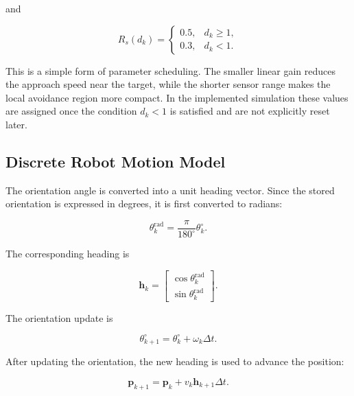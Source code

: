 \documentclass[10pt,twocolumn,a4paper]{article}
\begin{document}
and

\begin{equation}
    R_s(d_k)=
    \begin{cases}
        0.5, & d_k\geq 1,\\
        0.3, & d_k<1.
    \end{cases}
    \label{eq:range_schedule}
\end{equation}

This is a simple form of parameter scheduling. The smaller linear gain
reduces the approach speed near the target, while the shorter sensor
range makes the local avoidance region more compact. In the implemented
simulation these values are assigned once the condition $d_k<1$ is
satisfied and are not explicitly reset later.

\subsection{Discrete Robot Motion Model}

The orientation angle is converted into a unit heading vector. Since the
stored orientation is expressed in degrees, it is first converted to
radians:

\begin{equation}
    \theta_k^{\mathrm{rad}}
    =
    \frac{\pi}{180^{\circ}}\theta_k^{\circ}.
    \label{eq:deg_to_rad}
\end{equation}

The corresponding heading is

\begin{equation}
    \mathbf{h}_k
    =
    \begin{bmatrix}
        \cos\theta_k^{\mathrm{rad}}\\
        \sin\theta_k^{\mathrm{rad}}
    \end{bmatrix}.
    \label{eq:heading_vector}
\end{equation}

The orientation update is

\begin{equation}
    \theta_{k+1}^{\circ}
    =
    \theta_k^{\circ}+\omega_k\Delta t.
    \label{eq:orientation_update}
\end{equation}

After updating the orientation, the new heading is used to advance the
position:

\begin{equation}
    \mathbf{p}_{k+1}
    =
    \mathbf{p}_k
    +v_k\mathbf{h}_{k+1}\Delta t.
    \label{eq:position_update}
\end{equation}
\end{document}
